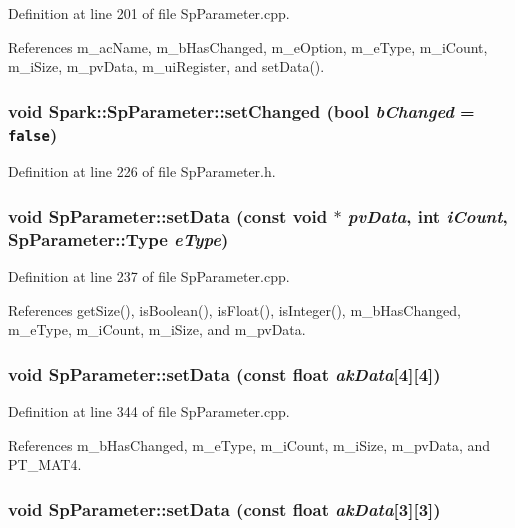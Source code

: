 Definition at line 201 of file Sp\-Parameter.cpp.

References m\_\-ac\-Name, m\_\-b\-Has\-Changed, m\_\-e\-Option, m\_\-e\-Type, m\_\-i\-Count, m\_\-i\-Size, m\_\-pv\-Data, m\_\-ui\-Register, and set\-Data().
\subsubsection{\setlength{\rightskip}{0pt plus 5cm}void Spark::Sp\-Parameter::set\-Changed (bool {\em b\-Changed} = {\tt false})\hspace{0.3cm}{\tt  [inline]}}\label{classSpark_1_1SpParameter_a42}


Definition at line 226 of file Sp\-Parameter.h.
\subsubsection{\setlength{\rightskip}{0pt plus 5cm}void Sp\-Parameter::set\-Data (const void $\ast$ {\em pv\-Data}, int {\em i\-Count}, {\bf Sp\-Parameter::Type} {\em e\-Type})}\label{classSpark_1_1SpParameter_a36}


Definition at line 237 of file Sp\-Parameter.cpp.

References get\-Size(), is\-Boolean(), is\-Float(), is\-Integer(), m\_\-b\-Has\-Changed, m\_\-e\-Type, m\_\-i\-Count, m\_\-i\-Size, and m\_\-pv\-Data.
\subsubsection{\setlength{\rightskip}{0pt plus 5cm}void Sp\-Parameter::set\-Data (const float {\em ak\-Data}[4][4])}\label{classSpark_1_1SpParameter_a35}


Definition at line 344 of file Sp\-Parameter.cpp.

References m\_\-b\-Has\-Changed, m\_\-e\-Type, m\_\-i\-Count, m\_\-i\-Size, m\_\-pv\-Data, and PT\_\-MAT4.
\subsubsection{\setlength{\rightskip}{0pt plus 5cm}void Sp\-Parameter::set\-Data (const float {\em ak\-Data}[3][3])}\label{classSpark_1_1SpParameter_a34}


